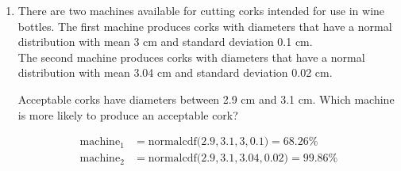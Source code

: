 \documentclass[basic, header]{nosvagor-notes}
\begin{document}
\begin{enumerate}[itemsep=4em]
\begin{enumerate}
    \end{enumerate}

  \item There are two machines available for cutting corks intended for use in
    wine bottles. The first machine produces corks with diameters that have a
    normal distribution with mean 3 cm and standard deviation 0.1 cm.\\ The
    second machine produces corks with diameters that have a normal
    distribution with mean 3.04 cm and standard deviation 0.02 cm.

    Acceptable corks have diameters between 2.9 cm and 3.1 cm. Which machine is more likely to
    produce an acceptable cork?

    \begin{align*}
      \text{machine}_1 &= \text{normalcdf($2.9,3.1,3,0.1$)} = 68.26\%\\
      \text{machine}_2 &= \text{normalcdf($2.9,3.1,3.04,0.02$)} = 99.86\%
    \end{align*}

\end{enumerate}
\end{document}
